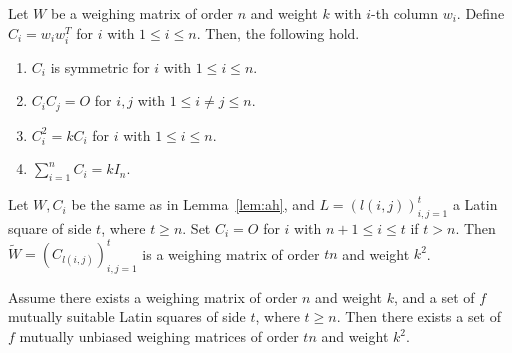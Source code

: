 \documentclass[10pt,a4paper]{amsart}
\begin{document}
\begin{lem}\label{lem:ah}
Let $W$ be a weighing matrix of order $n$ and weight $k$ with $i$-th column $w_i$. 
Define $C_i=w_i w_i^T$ for $i$ with $1\leq i\leq n$. 
Then, the following hold. 
\begin{enumerate}
\item $C_i$ is symmetric  for $i$ with $1\leq i\leq n$. 
\item $C_i C_j=O$ for $i,j$ with $1\leq i\neq j\leq n$.
\item $C_i^2=k C_i$ for $i$ with $1\leq i\leq n$. 
\item $\sum_{i=1}^n C_i=k I_n$. 
\end{enumerate} 
\end{lem}

\begin{lem}\label{lem:ls}
Let $W,C_i$ be the same as in Lemma~\ref{lem:ah}, and $L=(l(i,j))_{i,j=1}^t$ a Latin square of side $t$, where $t \ge n$. 
Set $C_i=O$ for $i$ with $n+1 \le i \le t$ if $t>n$. 
Then $\widetilde{W}=(C_{l(i,j)})_{i,j=1}^t$ is a weighing matrix of order $tn$ and weight $k^2$.
\end{lem}

\begin{thm}\label{thm:msls}
Assume there exists a weighing matrix of order $n$ and weight $k$, and 
a set of $f$ mutually suitable Latin squares of side $t$, where $t\geq n$.
Then
there exists a set of $f$ mutually unbiased weighing matrices of order $tn$ and weight $k^2$.
\end{thm}
\end{document}
